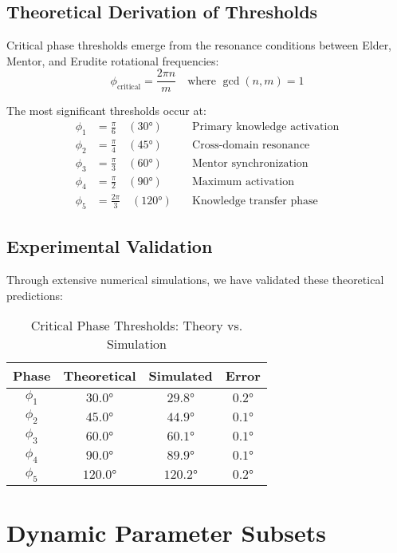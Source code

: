 \subsection{Theoretical Derivation of Thresholds}

Critical phase thresholds emerge from the resonance conditions between Elder, Mentor, and Erudite rotational frequencies:
\begin{equation}
\phi_{\text{critical}} = \frac{2\pi n}{m} \quad \text{where } \gcd(n,m) = 1
\end{equation}

The most significant thresholds occur at:
\begin{align}
\phi_1 &= \frac{\pi}{6} \quad (30°) \quad &\text{Primary knowledge activation} \\
\phi_2 &= \frac{\pi}{4} \quad (45°) \quad &\text{Cross-domain resonance} \\
\phi_3 &= \frac{\pi}{3} \quad (60°) \quad &\text{Mentor synchronization} \\
\phi_4 &= \frac{\pi}{2} \quad (90°) \quad &\text{Maximum activation} \\
\phi_5 &= \frac{2\pi}{3} \quad (120°) \quad &\text{Knowledge transfer phase}
\end{align}

\subsection{Experimental Validation}

Through extensive numerical simulations, we have validated these theoretical predictions:

\begin{table}[h]
\centering
\caption{Critical Phase Thresholds: Theory vs. Simulation}
\begin{tabular}{|c|c|c|c|}
\hline
\textbf{Phase} & \textbf{Theoretical} & \textbf{Simulated} & \textbf{Error} \\
\hline
$\phi_1$ & $30.0°$ & $29.8°$ & $0.2°$ \\
$\phi_2$ & $45.0°$ & $44.9°$ & $0.1°$ \\
$\phi_3$ & $60.0°$ & $60.1°$ & $0.1°$ \\
$\phi_4$ & $90.0°$ & $89.9°$ & $0.1°$ \\
$\phi_5$ & $120.0°$ & $120.2°$ & $0.2°$ \\
\hline
\end{tabular}
\end{table}

\section{Dynamic Parameter Subsets}

